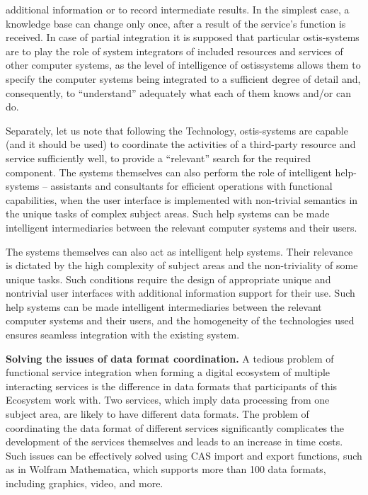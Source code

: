 \documentclass{article}
\begin{document}
\begin{multicols}{2}
additional information or to record intermediate results.
In the simplest case, a knowledge base can change
only once, after a result of the service’s function is
received. 
In case of partial integration it is supposed that
particular ostis-systems are to play the role of system
integrators of included resources and services of other
computer systems, as the level of intelligence of ostissystems allows them to specify the computer systems
being integrated to a sufficient degree of detail and,
consequently, to “understand” adequately what each of
them knows and/or can do.
\par Separately, let us note that following the Technology,
ostis-systems are capable (and it should be used) to coordinate the activities of a third-party resource and service sufficiently well, to provide a “relevant” search for the
required component. The systems themselves can also
perform the role of intelligent help-systems – assistants
and consultants for efficient operations with functional
capabilities, when the user interface is implemented with
non-trivial semantics in the unique tasks of complex
subject areas. Such help systems can be made intelligent
intermediaries between the relevant computer systems
and their users.
\par The systems themselves can also act as intelligent
help systems. Their relevance is dictated by the high
complexity of subject areas and the non-triviality of
some unique tasks. Such conditions require the design
of appropriate unique and nontrivial user interfaces with
additional information support for their use. Such help
systems can be made intelligent intermediaries between
the relevant computer systems and their users, and the
homogeneity of the technologies used ensures seamless
integration with the existing system.
\par \textbf{Solving the issues of data format coordination.} A
tedious problem of functional service integration when
forming a digital ecosystem of multiple interacting services is the difference in data formats that participants of this Ecosystem work with. Two services, which imply
data processing from one subject area, are likely to have
different data formats. The problem of coordinating the
data format of different services significantly complicates
the development of the services themselves and leads to
an increase in time costs. Such issues can be effectively
solved using CAS import and export functions, such as
in Wolfram Mathematica, which supports more than 100
data formats, including graphics, video, and more.

\end{multicols}
\end{document}
